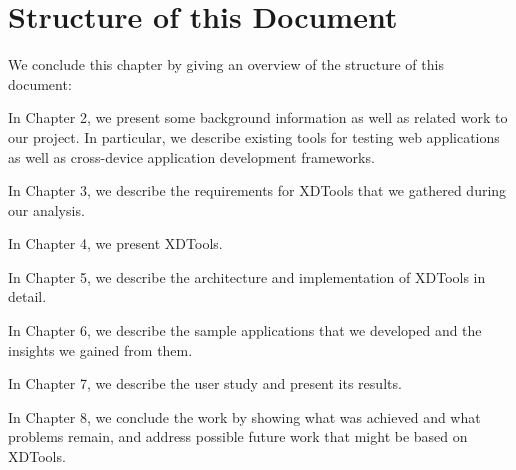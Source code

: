 \section{Structure of this Document}

We conclude this chapter by giving an overview of the structure of this document:

In Chapter 2, we present some background information as well as related work to our project. In particular, we describe existing tools for testing web applications as well as cross-device application development frameworks.

In Chapter 3, we describe the requirements for XDTools that we gathered during our analysis.

In Chapter 4, we present XDTools.

In Chapter 5, we describe the architecture and implementation of XDTools in detail.

In Chapter 6, we describe the sample applications that we developed and the insights we gained from them.

In Chapter 7, we describe the user study and present its results.

In Chapter 8, we conclude the work by showing what was achieved and what problems remain, and address possible future work that might be based on XDTools.